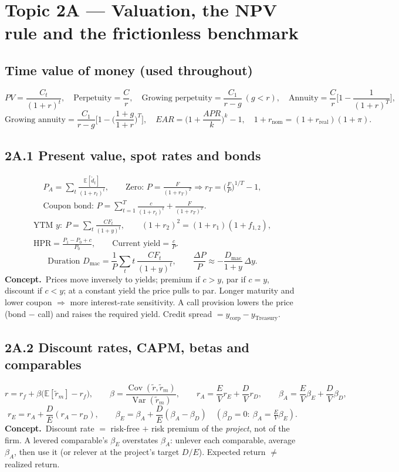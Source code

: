 \documentclass[10pt,a4paper]{article}
\newcommand{\blk}[1]{\subsection*{\color{blue!55!black}#1}}
\newcommand{\idea}{\textbf{Concept.}~}
\newcommand{\E}{\mathbb{E}}
\begin{document}
\section*{Topic 2A --- Valuation, the NPV rule and the frictionless benchmark}

\blk{Time value of money (used throughout)}
\[
PV=\frac{C_t}{(1+r)^t},\quad
\text{Perpetuity}=\frac{C}{r},\quad
\text{Growing perpetuity}=\frac{C_1}{r-g}\ (g<r),\quad
\text{Annuity}=\frac{C}{r}\Big[1-\frac{1}{(1+r)^T}\Big],
\]
\[
\text{Growing annuity}=\frac{C_1}{r-g}\Big[1-\Big(\frac{1+g}{1+r}\Big)^{T}\Big],\quad
EAR=\Big(1+\frac{APR}{k}\Big)^{k}-1,\quad
1+r_{\text{nom}}=(1+r_{\text{real}})(1+\pi).
\]

\blk{2A.1 Present value, spot rates and bonds}
\begin{gather*}
P_A=\sum_t\frac{\E[\tilde d_t]}{(1+r_t)^t},\qquad
\text{Zero: } P=\frac{F}{(1+r_T)^T}\Rightarrow r_T=\Big(\frac FP\Big)^{1/T}-1,\\
\text{Coupon bond: } P=\sum_{t=1}^{T}\frac{c}{(1+r_t)^t}+\frac{F}{(1+r_T)^T}.
\end{gather*}
\begin{gather*}
\text{YTM } y:\ P=\sum_t\frac{CF_t}{(1+y)^t},\qquad
(1+r_2)^2=(1+r_1)(1+f_{1,2}),\\
\text{HPR}=\frac{P_1-P_0+c}{P_0},\qquad
\text{Current yield}=\frac{c}{P}.
\end{gather*}
\[
\text{Duration } D_{\text{mac}}=\frac{1}{P}\sum_t t\,\frac{CF_t}{(1+y)^t},\qquad
\frac{\Delta P}{P}\approx-\frac{D_{\text{mac}}}{1+y}\,\Delta y.
\]
\idea Prices move inversely to yields; premium if $c>y$, par if $c=y$, discount if $c<y$; at a
constant yield the price pulls to par. Longer maturity and lower coupon $\Rightarrow$ more interest-rate
sensitivity. A call provision lowers the price (bond $-$ call) and raises the required yield. Credit
spread $=y_{\text{corp}}-y_{\text{Treasury}}$.

\blk{2A.2 Discount rates, CAPM, betas and comparables}
\[
r=r_f+\beta\big(\E[\tilde r_m]-r_f\big),\qquad
\beta=\frac{\operatorname{Cov}(\tilde r,\tilde r_m)}{\operatorname{Var}(\tilde r_m)},\qquad
r_A=\frac{E}{V}r_E+\frac{D}{V}r_D,\qquad
\beta_A=\frac{E}{V}\beta_E+\frac{D}{V}\beta_D,
\]
\[
r_E=r_A+\frac{D}{E}(r_A-r_D),\qquad \beta_E=\beta_A+\frac DE(\beta_A-\beta_D)\quad(\beta_D=0:\ \beta_A=\tfrac EV\beta_E).
\]
\idea Discount rate $=$ risk-free $+$ risk premium of the \emph{project}, not of the firm. A levered
comparable's $\beta_E$ overstates $\beta_A$: unlever each comparable, average $\beta_A$, then use it
(or relever at the project's target $D/E$). Expected return $\ne$ realized return.
\end{document}
